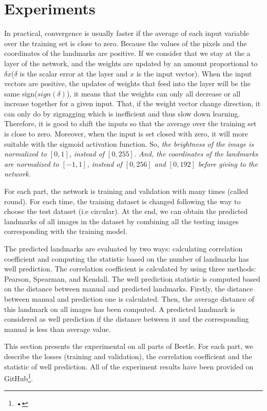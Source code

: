 \documentclass[12pt,a4paper]{article}
\begin{document}
\section{Experiments}
In practical, convergence is usually faster if the average of each input variable over the training set is close to zero. Because the values of the pixels and the coordinates of the landmarks are positive. If we consider that we stay at the a layer of the network, and the weights are updated by an amount proportional to $\delta x$($\delta$ is the scalar error at the layer and $x$ is the input vector). When the input vectors are positive, the updates of weights that feed into the layer will be the same sign($sign(\delta)$), it means that the weights can only all decrease or all increase together for a given input. That, if the weight vector change direction, it can only do by zigzagging which is inefficient and thus slow down learning. Therefore, it is good to shift the inputs so that the average over the training set is close to zero. Moreover, when the input is set closed with zero, it will more suitable with the sigmoid activation function\cite{lecun2012efficient}. So, \textit{the brightness of the image is normalized to $[0,1]$, instead of $[0,255]$. And, the coordinates of the landmarks are normalized to $[-1,1]$, instead of $[0,256]$ and $[0,192]$ before giving to the network}.

For each part, the network is training and validation with many times (called round). For each time, the training dataset is changed following the way to choose the test dataset (i.e circular). At the end, we can obtain the predicted landmarks of all images in the dataset by combining all the  testing images corresponding with the training model. 

The predicted landmarks are evaluated by two ways: calculating correlation coefficient and computing the statistic based on the number of landmarks has well prediction.
The correlation coefficient is calculated by using three methods: Pearson\cite{pallant2013spss}, Spearman\cite{myers2010research}, and Kendall\cite{kendall1938new}. The well prediction statistic is computed based on the distance between manual and predicted landmarks. Firstly, the distance between manual and prediction one is calculated. Then, the average distance of this landmark on all images has been computed. A predicted landmark is considered as well prediction if the distance between it and the corresponding manual is less than average value.

This section presents the experimental on all parts of Beetle. For each part, we describe the losses (training and validation), the correlation coefficient and the statistic of well prediction. All of the experiment results have been provided on GitHub\footnote{•}.
\pagebreak
\end{document}
